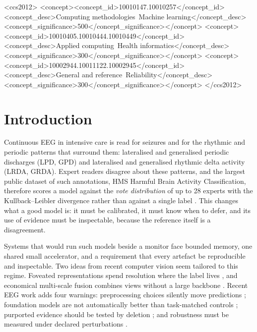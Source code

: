 \documentclass[sigconf,anonymous]{acmart}
\begin{document}
\begin{CCSXML}
<ccs2012>
<concept><concept_id>10010147.10010257</concept_id><concept_desc>Computing methodologies~Machine learning</concept_desc><concept_significance>500</concept_significance></concept>
<concept><concept_id>10010405.10010444.10010449</concept_id><concept_desc>Applied computing~Health informatics</concept_desc><concept_significance>300</concept_significance></concept>
<concept><concept_id>10002944.10011122.10002945</concept_id><concept_desc>General and reference~Reliability</concept_desc><concept_significance>300</concept_significance></concept>
</ccs2012>
\end{CCSXML}

\maketitle

\section{Introduction}
Continuous EEG in intensive care is read for seizures and for the rhythmic and periodic patterns that surround them: lateralised and generalised periodic discharges (LPD, GPD) and lateralised and generalised rhythmic delta activity (LRDA, GRDA). Expert readers disagree about these patterns, and the largest public dataset of such annotations, HMS Harmful Brain Activity Classification, therefore scores a model against the \emph{vote distribution} of up to 28 experts with the Kullback--Leibler divergence rather than against a single label \cite{hms2024,jing2023}. This changes what a good model is: it must be calibrated, it must know when to defer, and its use of evidence must be inspectable, because the reference itself is a disagreement.

Systems that would run such models beside a monitor face bounded memory, one shared small accelerator, and a requirement that every artefact be reproducible and inspectable. Two ideas from recent computer vision seem tailored to this regime. Foveated representations spend resolution where the label lives \cite{akbas2017foveated}, and economical multi-scale fusion combines views without a large backbone \cite{kang2026dpnext}. Recent EEG work adds four warnings: preprocessing choices silently move predictions \cite{hou2026samebrain}; foundation models are not automatically better than task-matched controls \cite{kontras2026neuroatlas}; purported evidence should be tested by deletion \cite{wang2026evidence}; and robustness must be measured under declared perturbations \cite{mohammadi2026robustseiz}.
\end{document}

